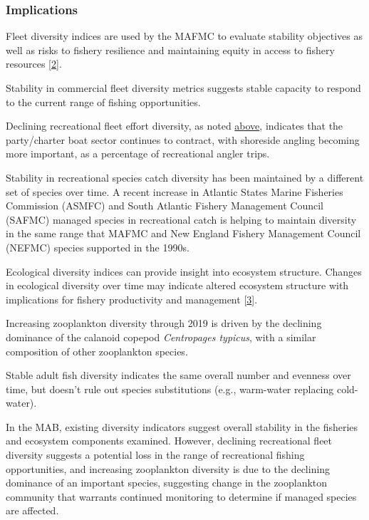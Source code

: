\documentclass[
  10pt,
]{article}
\begin{document}
\hypertarget{implications-3}{%
\subsubsection{Implications}\label{implications-3}}

Fleet diversity indices are used by the MAFMC to evaluate stability
objectives as well as risks to fishery resilience and maintaining equity
in access to fishery resources
{[}\protect\hyperlink{ref-gaichas_implementing_2018}{2}{]}.

Stability in commercial fleet diversity metrics suggests stable capacity
to respond to the current range of fishing opportunities.

Declining recreational fleet effort diversity, as noted
\protect\hyperlink{recreational-opportunities}{above}, indicates that
the party/charter boat sector continues to contract, with shoreside
angling becoming more important, as a percentage of recreational angler
trips.

Stability in recreational species catch diversity has been maintained by
a different set of species over time. A recent increase in Atlantic
States Marine Fisheries Commission (ASMFC) and South Atlantic Fishery
Management Council (SAFMC) managed species in recreational catch is
helping to maintain diversity in the same range that MAFMC and New
England Fishery Management Council (NEFMC) species supported in the
1990s.

Ecological diversity indices can provide insight into ecosystem
structure. Changes in ecological diversity over time may indicate
altered ecosystem structure with implications for fishery productivity
and management {[}\protect\hyperlink{ref-friedland_changes_2020}{3}{]}.

Increasing zooplankton diversity through 2019 is driven by the declining
dominance of the calanoid copepod \emph{Centropages typicus}, with a
similar composition of other zooplankton species.

Stable adult fish diversity indicates the same overall number and
evenness over time, but doesn't rule out species substitutions (e.g.,
warm-water replacing cold-water).

In the MAB, existing diversity indicators suggest overall stability in
the fisheries and ecosystem components examined. However, declining
recreational fleet diversity suggests a potential loss in the range of
recreational fishing opportunities, and increasing zooplankton diversity
is due to the declining dominance of an important species, suggesting
change in the zooplankton community that warrants continued monitoring
to determine if managed species are affected.
\end{document}
